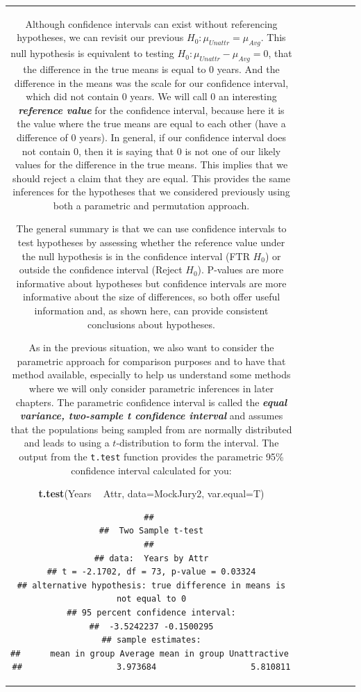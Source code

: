 \documentclass[]{book}
\newenvironment{Shaded}{\begin{snugshade}}{\end{snugshade}}
\newcommand{\KeywordTok}[1]{\textcolor[rgb]{0.13,0.29,0.53}{\textbf{#1}}}
\newcommand{\DataTypeTok}[1]{\textcolor[rgb]{0.13,0.29,0.53}{#1}}
\newcommand{\StringTok}[1]{\textcolor[rgb]{0.31,0.60,0.02}{#1}}
\newcommand{\OperatorTok}[1]{\textcolor[rgb]{0.81,0.36,0.00}{\textbf{#1}}}
\newcommand{\NormalTok}[1]{#1}
\theoremstyle{definition}
\theoremstyle{definition}
\theoremstyle{remark}
\begin{document}
\begin{longtable}[]{@{}ccccccc@{}}
\begin{minipage}[b]{0.10\columnwidth}
\begin{Shaded}
\begin{Highlighting}[]
\begin{Shaded}
\begin{Highlighting}[]
Although confidence intervals can exist without referencing hypotheses,
we can revisit our previous \(H_0: \mu_{Unattr} = \mu_{Avg}\). This null
hypothesis is equivalent to testing
\(H_0: \mu_{Unattr} - \mu_{Avg} = 0\), that the difference in the true
means is equal to 0 years. And the difference in the means was the scale
for our confidence interval, which did not contain 0 years. We will call
0 an interesting \textbf{\emph{reference value}} for the confidence
interval, because here it is the value where the true means are equal to
each other (have a difference of 0 years). In general, if our confidence
interval does not contain 0, then it is saying that 0 is not one of our
likely values for the difference in the true means. This implies that we
should reject a claim that they are equal. This provides the same
inferences for the hypotheses that we considered previously using both a
parametric and permutation approach.

The general summary is that we can use confidence intervals to test
hypotheses by assessing whether the reference value under the null
hypothesis is in the confidence interval (FTR \(H_0\)) or outside the
confidence interval (Reject \(H_0\)). P-values are more informative
about hypotheses but confidence intervals are more informative about the
size of differences, so both offer useful information and, as shown
here, can provide consistent conclusions about hypotheses.

As in the previous situation, we also want to consider the parametric
approach for comparison purposes and to have that method available,
especially to help us understand some methods where we will only
consider parametric inferences in later chapters. The parametric
confidence interval is called the \textbf{\emph{equal variance,
two-sample t confidence interval}} and assumes that the populations
being sampled from are normally distributed and leads to using a
\(t\)-distribution to form the interval. The output from the
\texttt{t.test} function provides the parametric 95\% confidence
interval calculated for you:

\begin{Shaded}
\begin{Highlighting}[]
\KeywordTok{t.test}\NormalTok{(Years }\OperatorTok{~}\StringTok{ }\NormalTok{Attr, }\DataTypeTok{data=}\NormalTok{MockJury2, }\DataTypeTok{var.equal=}\NormalTok{T)}
\end{Highlighting}
\end{Shaded}

\begin{verbatim}
## 
##  Two Sample t-test
## 
## data:  Years by Attr
## t = -2.1702, df = 73, p-value = 0.03324
## alternative hypothesis: true difference in means is not equal to 0
## 95 percent confidence interval:
##  -3.5242237 -0.1500295
## sample estimates:
##      mean in group Average mean in group Unattractive 
##                   3.973684                   5.810811
\end{verbatim}


\end{Highlighting}
\end{Shaded}
\end{Highlighting}
\end{Shaded}
\end{minipage}
\end{longtable}
\end{document}
